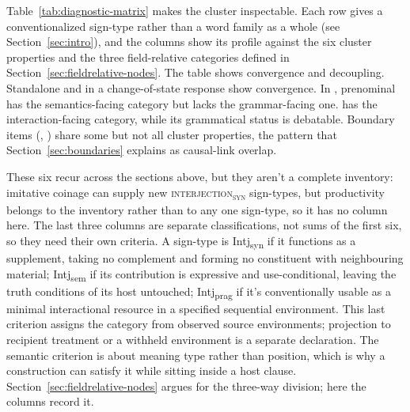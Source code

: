 \documentclass[12pt]{article}
\newcommand{\intj}[1]{\textsc{interjection\textsubscript{#1}}}
\newcommand{\intjshort}[1]{Intj\textsubscript{#1}}
\begin{document}
Table~\ref{tab:diagnostic-matrix} makes the cluster inspectable.
Each row gives a conventionalized sign-type rather than a word family as a
whole (see Section~\ref{sec:intro}), and the columns show its profile against
the six cluster properties and the three field-relative categories defined in
Section~\ref{sec:fieldrelative-nodes}. The table
shows convergence and decoupling. Standalone  and
 in a change-of-state response show convergence. In
, prenominal
 has the semantics-facing category but lacks the grammar-facing
one.  has the interaction-facing category, while its grammatical status
is debatable. Boundary items (, ) share some
but not all cluster properties, the pattern that
Section~\ref{sec:boundaries} explains as causal-link overlap.

These six recur across the sections above, but they aren't a complete
inventory: imitative coinage can supply new \intj{syn} sign-types, but
productivity belongs to the inventory rather than to any one sign-type, so it
has no column here. The last three columns
are separate classifications, not sums of the first six, so they need their own
criteria. A sign-type is
\intjshort{syn} if it functions as a supplement, taking no
complement and forming no constituent with neighbouring material;
\intjshort{sem} if its contribution is expressive and
use-conditional, leaving the truth conditions of its host untouched;
\intjshort{prag} if it's conventionally usable as a minimal interactional
resource in a specified sequential environment. This last criterion assigns
the category from observed source environments; projection to recipient
treatment or a withheld environment is a separate declaration.
The semantic criterion is about meaning type rather than position, which is
why a construction can satisfy it while sitting inside a host clause.
Section~\ref{sec:fieldrelative-nodes} argues for the three-way division; here
the columns record it.
\end{document}
